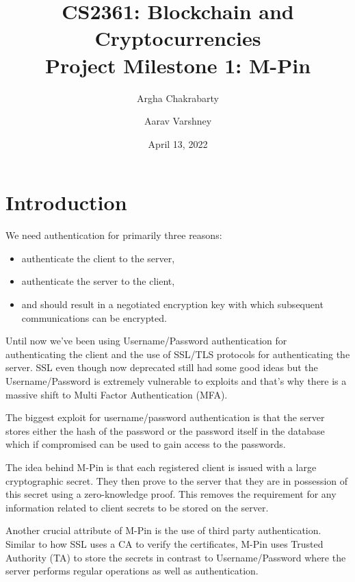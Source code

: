 \documentclass[]{article}   %
\begin{document}
\title{CS2361: Blockchain and Cryptocurrencies\\ Project Milestone 1: M-Pin}   %
\author{Argha Chakrabarty \and Aarav Varshney}         %
\date{April 13, 2022}    %
\maketitle

\section*{Introduction}
We need authentication for primarily three reasons:
\begin{itemize}
    \itemsep0em
    \item authenticate the client to the server,
    \item authenticate the server to the client,
    \item and should result in a negotiated encryption key with which subsequent communications can be encrypted.
\end{itemize}
Until now we've been using Username/Password authentication for authenticating the client and the use of SSL/TLS protocols for authenticating the server. SSL even though now deprecated still had some good ideas but the Username/Password is extremely vulnerable to exploits and that's why there is a massive shift to Multi Factor Authentication (MFA).

The biggest exploit for username/password authentication is that the server stores either the hash of the password or the password itself in the database which if compromised can be used to gain access to the passwords.

The idea behind M-Pin is that each registered client is issued with a large cryptographic secret. They then prove to the server that they are in possession of this secret using a zero-knowledge proof. This removes the requirement for any information related to client secrets to be stored on the server.

Another crucial attribute of M-Pin is the use of third party authentication. Similar to how SSL uses a CA to verify the certificates, M-Pin uses Trusted Authority (TA) to store the secrets in contrast to Username/Password where the server performs regular operations as well as authentication.

\newpage
\end{document}
